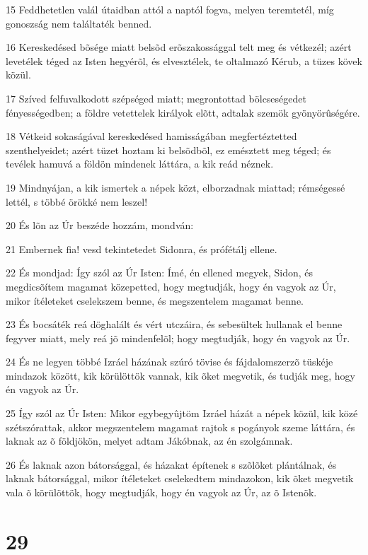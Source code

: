 \par 15 Feddhetetlen valál útaidban attól a naptól fogva, melyen teremtetél, míg gonoszság nem találtaték benned.
\par 16 Kereskedésed bõsége miatt belsõd erõszakossággal telt meg és vétkezél; azért levetélek téged az Isten hegyérõl, és elvesztélek, te oltalmazó Kérub, a tüzes kövek közül.
\par 17 Szíved felfuvalkodott szépséged miatt; megrontottad bölcseségedet fényességedben;  a földre vetettelek királyok elõtt, adtalak szemök gyönyörûségére.
\par 18 Vétkeid sokaságával kereskedésed hamisságában megfertéztetted szenthelyeidet; azért tüzet hoztam ki belsõdbõl, ez emésztett meg téged; és tevélek hamuvá a földön mindenek láttára, a kik reád néznek.
\par 19 Mindnyájan, a kik ismertek a népek közt, elborzadnak miattad; rémségessé lettél, s többé örökké nem leszel!
\par 20 És lõn az Úr beszéde hozzám, mondván:
\par 21 Embernek fia! vesd tekintetedet Sidonra, és prófétálj ellene.
\par 22 És mondjad: Így szól az Úr Isten: Ímé, én ellened megyek, Sidon, és megdicsõítem magamat közepetted, hogy megtudják, hogy én vagyok az Úr, mikor ítéleteket cselekszem benne, és megszentelem magamat benne.
\par 23 És bocsáték reá döghalált és vért utczáira, és sebesültek hullanak el benne fegyver miatt, mely reá jõ mindenfelõl; hogy megtudják, hogy én vagyok az Úr.
\par 24 És ne legyen többé Izráel házának szúró tövise és fájdalomszerzõ tüskéje mindazok között, kik körülöttök vannak, kik õket megvetik, és tudják meg, hogy én vagyok az Úr.
\par 25 Így szól az Úr Isten: Mikor egybegyûjtöm Izráel házát a népek közül, kik közé szétszórattak, akkor megszentelem magamat rajtok s pogányok szeme láttára, és laknak az õ földjökön, melyet adtam Jákóbnak, az én szolgámnak.
\par 26 És laknak azon bátorsággal, és házakat építenek s szõlõket plántálnak, és laknak bátorsággal, mikor ítéleteket cselekedtem mindazokon, kik õket megvetik vala õ körülöttök, hogy megtudják, hogy én vagyok az Úr, az õ Istenök.

\chapter{29}

